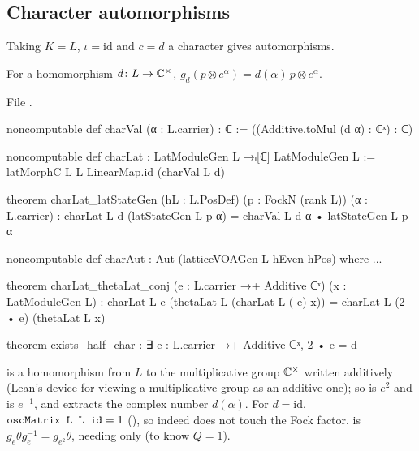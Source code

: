 \subsection{Character automorphisms}

Taking $K=L$, $\iota=\mathrm{id}$ and $c=d$ a character gives automorphisms.

\begin{definition}\label{ch03:def:charAut}
For a homomorphism $d\colon L\to{\mathbb{C}}^\times$, $g_d(p\otimes e^\alpha)=d(\alpha)\,p\otimes e^\alpha$.
\end{definition}
\noindent File .
\begin{leancode}
noncomputable def charVal (α : L.carrier) : ℂ := ((Additive.toMul (d α) : ℂˣ) : ℂ)

noncomputable def charLat : LatModuleGen L →ₗ[ℂ] LatModuleGen L :=
  latMorphC L L LinearMap.id (charVal L d)

theorem charLat_latStateGen (hL : L.PosDef) (p : FockN (rank L)) (α : L.carrier) :
    charLat L d (latStateGen L p α) = charVal L d α • latStateGen L p α

noncomputable def charAut : Aut (latticeVOAGen L hEven hPos) where ...

theorem charLat_thetaLat_conj (e : L.carrier →+ Additive ℂˣ) (x : LatModuleGen L) :
    charLat L e (thetaLat L (charLat L (-e) x)) = charLat L (2 • e) (thetaLat L x)

theorem exists_half_char : ∃ e : L.carrier →+ Additive ℂˣ, 2 • e = d
\end{leancode}
\begin{dictionary}
 is a homomorphism from $L$ to the multiplicative group ${\mathbb{C}}^\times$
written additively (Lean's device for viewing a multiplicative group as an additive one); so
 is $e^2$ and  is $e^{-1}$, and  extracts the complex number
$d(\alpha)$. For $d=\mathrm{id}$, $\lean{oscMatrix L L id}=1$ (), so
 indeed does not touch the Fock factor.  is
$g_e\theta g_e^{-1}=g_{e^2}\theta$, needing only  (to know $Q=1$).
\end{dictionary}

